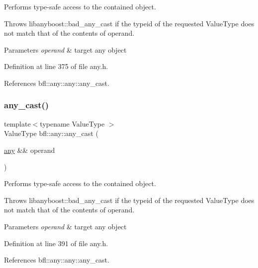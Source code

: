 Performs type-\/safe access to the contained object. 

Throws libanyboost\+::bad\+\_\+any\+\_\+cast if the typeid of the requested Value\+Type does not match that of the contents of operand.


\begin{DoxyParams}{Parameters}
{\em operand} & target any object \\
\hline
\end{DoxyParams}


Definition at line 375 of file any.\+h.



References bfl\+::any\+::any\+::any\+\_\+cast.

\mbox{\label{namespacebfl_1_1any_ad3725007dbc3ccb1af3f821dc5a3afd3}} 
\subsubsection{\texorpdfstring{any\+\_\+cast()}{any\_cast()}\hspace{0.1cm}{\footnotesize\ttfamily [5/5]}}
{\footnotesize\ttfamily template$<$typename Value\+Type $>$ \\
Value\+Type bfl\+::any\+::any\+\_\+cast (\begin{DoxyParamCaption}\item[{\mbox{\hyperlink{classbfl_1_1any_1_1any}{any}} \&\&}]{operand }\end{DoxyParamCaption})\hspace{0.3cm}{\ttfamily [inline]}}



Performs type-\/safe access to the contained object. 

Throws libanyboost\+::bad\+\_\+any\+\_\+cast if the typeid of the requested Value\+Type does not match that of the contents of operand.


\begin{DoxyParams}{Parameters}
{\em operand} & target any object \\
\hline
\end{DoxyParams}


Definition at line 391 of file any.\+h.



References bfl\+::any\+::any\+::any\+\_\+cast.

\mbox{\label{namespacebfl_1_1any_adb1328ea975e3bf9c0addc1689215bad}} 
